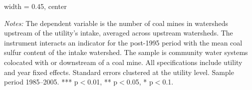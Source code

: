\begin{table}[htbp]
\begin{adjustbox}{width = 0.45\textwidth, center}
      
   \end{adjustbox}
      {\tiny\linespread{1}\selectfont \par \raggedright 
   \textit{Notes:} The dependent variable is the number of coal mines in watersheds upstream of the utility's intake, averaged across upstream watersheds. The instrument interacts an indicator for the post-1995 period with the mean coal sulfur content of the intake watershed. The sample is community water systems colocated with or downstream of a coal mine. All specifications include utility and year fixed effects. Standard errors clustered at the utility level. Sample period 1985--2005. *** p$<$0.01, ** p$<$0.05, * p$<$0.1.}
   
\end{table}


